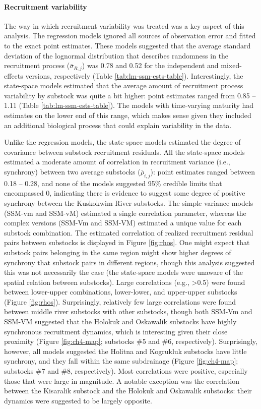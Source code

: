 \documentclass[12pt,]{book}
\let\oldparagraph\paragraph
\renewcommand{\paragraph}[1]{\oldparagraph{#1}\mbox{}}
\theoremstyle{definition}
\theoremstyle{definition}
\theoremstyle{definition}
\theoremstyle{remark}
\begin{document}
\paragraph{Recruitment variability}\label{recruitment-variability}

\noindent
The way in which recruitment variability was treated was a key aspect of
this analysis. The regression models ignored all sources of observation
error and fitted to the exact point estimates. These models suggested
that the average standard deviation of the lognormal distribution that
describes randomness in the recruitment process (\(\bar{\sigma}_{R,j}\))
was 0.78 and 0.52 for the independent and mixed-effects versions,
respectively (Table \ref{tab:lm-ssm-ests-table}). Interestingly, the
state-space models estimated that the average amount of recruitment
process variability by substock was quite a bit higher: point estimates
ranged from 0.85 -- 1.11 (Table \ref{tab:lm-ssm-ests-table}). The models
with time-varying maturity had estimates on the lower end of this range,
which makes sense given they included an additional biological process
that could explain variability in the data.

Unlike the regression models, the state-space models estimated the
degree of covariance between substock recruitment residuals. All the
state-space models estimated a moderate amount of correlation in
recruitment variance (i.e., synchrony) between two average substocks
(\(\bar{\rho}_{i,j}\)): point estimates ranged between 0.18 -- 0.28, and
none of the models suggested 95\% credible limits that encompassed 0,
indicating there is evidence to suggest some degree of positive
synchrony between the Kuskokwim River substocks. The simple variance
models (SSM-vm and SSM-vM) estimated a single correlation parameter,
whereas the complex versions (SSM-Vm and SSM-VM) estimated a unique
value for each substock combination. The estimated correlation of
realized recruitment residual pairs between substocks is displayed in
Figure \ref{fig:rhos}. One might expect that substock pairs belonging in
the same region might show higher degrees of synchrony that substock
pairs in different regions, though this analysis suggested this was not
necessarily the case (the state-space models were unaware of the spatial
relation between substocks). Large correlations (e.g.,
\textgreater{}0.5) were found between lower-upper combinations,
lower-lower, and upper-upper substocks (Figure \ref{fig:rhos}).
Surprisingly, relatively few large correlations were found between
middle river substocks with other substocks, though both SSM-Vm and
SSM-VM suggested that the Holokuk and Oskawalik substocks have highly
synchronous recruitment dynamics, which is interesting given their close
proximity (Figure \ref{fig:ch4-map}; substocks \#5 and \#6,
respectively). Surprisingly, however, all models suggested the Holitna
and Kogrukluk substocks have little synchrony, and they fall within the
same subdrainage (Figure \ref{fig:ch4-map}; substocks \#7 and \#8,
respectively). Most correlations were positive, especially those that
were large in magnitude. A notable exception was the correlation between
the Kisaralik substock and the Holokuk and Oskawalik substocks: their
dynamics were suggested to be largely opposite.
\end{document}

